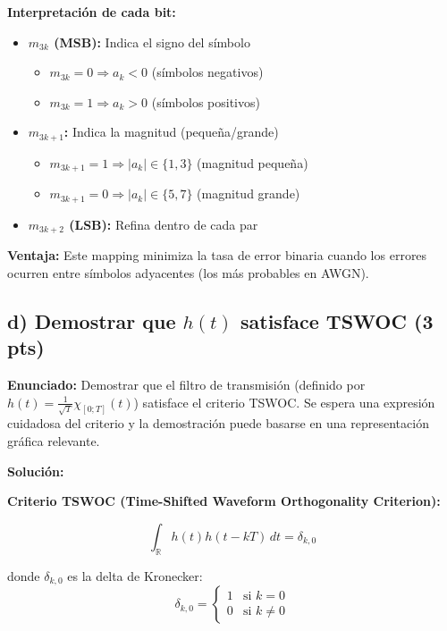 \documentclass[11pt,a4paper]{article}
\begin{document}
\textbf{Interpretaci\'on de cada bit:}

\begin{itemize}
    \item \textbf{$m_{3k}$ (MSB):} Indica el signo del s\'imbolo
    \begin{itemize}
        \item $m_{3k} = 0 \Rightarrow a_k < 0$ (s\'imbolos negativos)
        \item $m_{3k} = 1 \Rightarrow a_k > 0$ (s\'imbolos positivos)
    \end{itemize}
    
    \item \textbf{$m_{3k+1}$:} Indica la magnitud (peque\~na/grande)
    \begin{itemize}
        \item $m_{3k+1} = 1 \Rightarrow |a_k| \in \{1, 3\}$ (magnitud peque\~na)
        \item $m_{3k+1} = 0 \Rightarrow |a_k| \in \{5, 7\}$ (magnitud grande)
    \end{itemize}
    
    \item \textbf{$m_{3k+2}$ (LSB):} Refina dentro de cada par
\end{itemize}

\textbf{Ventaja:} Este mapping minimiza la tasa de error binaria cuando los errores ocurren entre s\'imbolos adyacentes (los m\'as probables en AWGN).



\subsection*{d) Demostrar que $h(t)$ satisface TSWOC (3 pts)}

\textbf{Enunciado:} Demostrar que el filtro de transmisi\'on (definido por $h(t) = \frac{1}{\sqrt{T}}\chi_{[0;T]}(t)$) satisface el criterio TSWOC. Se espera una expresi\'on cuidadosa del criterio y la demostraci\'on puede basarse en una representaci\'on gr\'afica relevante.

\vspace{0.3cm}
\textbf{Soluci\'on:}

\textbf{Criterio TSWOC (Time-Shifted Waveform Orthogonality Criterion):}

\[
\boxed{\int_{\mathbb{R}} h(t) h(t - kT)\, dt = \delta_{k,0}}
\]

donde $\delta_{k,0}$ es la delta de Kronecker:
\[
\delta_{k,0} = \begin{cases}
1 & \text{si } k = 0 \\
0 & \text{si } k \neq 0
\end{cases}
\]
\end{document}

